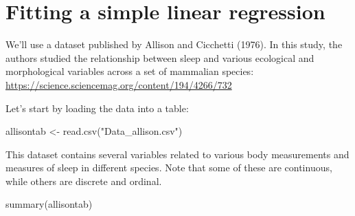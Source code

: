 \documentclass[
]{book}
\newenvironment{Shaded}{\begin{snugshade}}{\end{snugshade}}
\newcommand{\FunctionTok}[1]{\textcolor[rgb]{0.00,0.00,0.00}{#1}}
\newcommand{\NormalTok}[1]{#1}
\newcommand{\OtherTok}[1]{\textcolor[rgb]{0.56,0.35,0.01}{#1}}
\newcommand{\StringTok}[1]{\textcolor[rgb]{0.31,0.60,0.02}{#1}}
\begin{document}
\hypertarget{fitting-a-simple-linear-regression-1}{%
\section{Fitting a simple linear regression}\label{fitting-a-simple-linear-regression-1}}

We'll use a dataset published by Allison and Cicchetti (1976). In this study, the authors studied the relationship between sleep and various ecological and morphological variables across a set of mammalian species:
\url{https://science.sciencemag.org/content/194/4266/732}

Let's start by loading the data into a table:

\begin{Shaded}
\begin{Highlighting}[]
\NormalTok{allisontab }\OtherTok{\textless{}{-}} \FunctionTok{read.csv}\NormalTok{(}\StringTok{"Data\_allison.csv"}\NormalTok{)}
\end{Highlighting}
\end{Shaded}

This dataset contains several variables related to various body measurements and measures of sleep in different species. Note that some of these are continuous, while others are discrete and ordinal.

\begin{Shaded}
\begin{Highlighting}[]
\FunctionTok{summary}\NormalTok{(allisontab)}
\end{Highlighting}
\end{Shaded}
\end{document}
